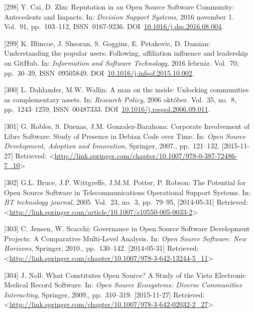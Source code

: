 \documentclass[12pt,magyar,a4paper,oneside]{scrreprt}
\begin{document}
\leavevmode\hypertarget{ref-cai_reputation_2016}{}%
{[}298{]} Y. Cai, D. Zhu: Reputation in an Open Source Software
Community: Antecedents and Impacts. In: \emph{Decision Support Systems},
2016 november 1. Vol.~91, pp.~103--112, ISSN~0167-9236.
DOI~\href{https://doi.org/10.1016/j.dss.2016.08.004}{10.1016/j.dss.2016.08.004}.

\leavevmode\hypertarget{ref-blincoe_understanding_2016}{}%
{[}299{]} K. Blincoe, J. Sheoran, S. Goggins, E. Petakovic, D. Damian:
Understanding the popular users: Following, affiliation influence and
leadership on GitHub. In: \emph{Information and Software Technology},
2016 február. Vol.~70, pp.~30--39, ISSN~09505849.
DOI~\href{https://doi.org/10.1016/j.infsof.2015.10.002}{10.1016/j.infsof.2015.10.002}.

\leavevmode\hypertarget{ref-dahlander_man_2006}{}%
{[}300{]} L. Dahlander, M.W. Wallin: A man on the inside: Unlocking
communities as complementary assets. In: \emph{Research Policy}, 2006
október. Vol.~35, no.~8, pp.~1243--1259, ISSN~00487333.
DOI~\href{https://doi.org/10.1016/j.respol.2006.09.011}{10.1016/j.respol.2006.09.011}.

\leavevmode\hypertarget{ref-robles_corporate_2007}{}%
{[}301{]} G. Robles, S. Duenas, J.M. Gonzalez-Barahona: Corporate
Involvement of Libre Software: Study of Presence in Debian Code over
Time. In: \emph{Open Source Development, Adoption and Innovation},
Springer, 2007., pp.~121--132. {[}2015-11-27{]} Retrieved:
\textless{}\url{http://link.springer.com/chapter/10.1007/978-0-387-72486-7_10}\textgreater{}

\leavevmode\hypertarget{ref-bruce_potential_2005}{}%
{[}302{]} G.L. Bruce, J.P. Wittgreffe, J.M.M. Potter, P. Robson: The
Potential for Open Source Software in Telecommunications Operational
Support Systems. In: \emph{BT technology journal}, 2005. Vol.~23, no.~3,
pp.~79--95, {[}2014-05-31{]} Retrieved:
\textless{}\url{http://link.springer.com/article/10.1007/s10550-005-0033-2}\textgreater{}

\leavevmode\hypertarget{ref-jensen_governance_2010}{}%
{[}303{]} C. Jensen, W. Scacchi: Governance in Open Source Software
Development Projects: A Comparative Multi-Level Analysis. In: \emph{Open
Source Software: New Horizons}, Springer, 2010., pp.~130--142.
{[}2014-05-31{]} Retrieved:
\textless{}\url{http://link.springer.com/chapter/10.1007/978-3-642-13244-5_11}\textgreater{}

\leavevmode\hypertarget{ref-noll_what_2009}{}%
{[}304{]} J. Noll: What Constitutes Open Source? A Study of the Vista
Electronic Medical Record Software. In: \emph{Open Source Ecosystems:
Diverse Communities Interacting}, Springer, 2009., pp.~310--319.
{[}2015-11-27{]} Retrieved:
\textless{}\url{http://link.springer.com/chapter/10.1007/978-3-642-02032-2_27}\textgreater{}
\end{document}
